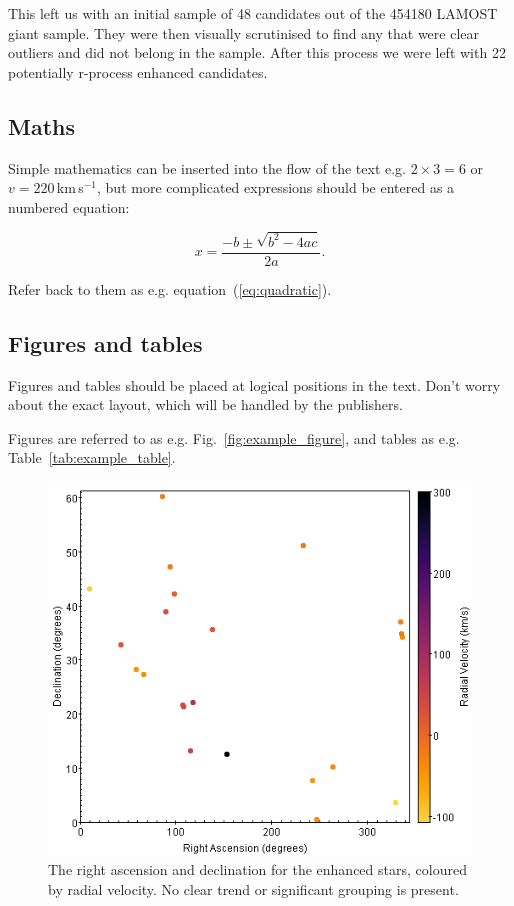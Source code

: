 \documentclass[a4paper,fleqn,usenatbib]{mnras}
\begin{document}
This left us with an initial sample of 48 candidates out of the 454180 LAMOST giant sample. They were then visually scrutinised to find any that were clear outliers and did not belong in the sample. After this process we were left with 22 potentially r-process enhanced candidates.


\subsection{Maths}
\label{sec:maths} 

Simple mathematics can be inserted into the flow of the text e.g. $2\times3=6$
or $v=220$\,km\,s$^{-1}$, but more complicated expressions should be entered
as a numbered equation:

\begin{equation}
    x=\frac{-b\pm\sqrt{b^2-4ac}}{2a}.
	\label{eq:quadratic}
\end{equation}

Refer back to them as e.g. equation~(\ref{eq:quadratic}).

\subsection{Figures and tables}

Figures and tables should be placed at logical positions in the text. Don't
worry about the exact layout, which will be handled by the publishers.

Figures are referred to as e.g. Fig.~\ref{fig:example_figure}, and tables as
e.g. Table~\ref{tab:example_table}.

\begin{figure}
	\includegraphics[width=\columnwidth]{RA_v_dec_radial_velocity}
	\caption{The right ascension and declination for the enhanced stars, coloured by radial velocity. No clear trend or significant grouping is present.}
	\label{fig:radec_Eucands}
\end{figure}
\end{document}
